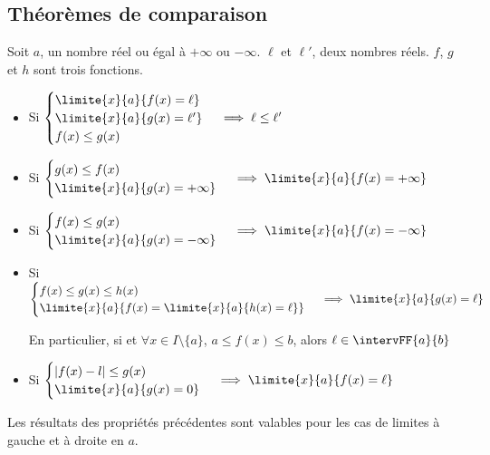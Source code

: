   \subsection{Théorèmes de comparaison}
\begin{propriete}[s]
	Soit $a$, un nombre réel ou égal à $+\infty$ ou $-\infty$. $\ell$ et $\ell'$, deux nombres réels. $f$, $g$ et $h$ sont trois fonctions.
	\begin{itemize}
		\item Si $\begin{cases}
		\limite{x}{a}{f(x)=\ell} \\
		\limite{x}{a}{g(x)=\ell'}\\
		f(x)\leq g(x)  
		\end{cases}\implies \ell \leq \ell'$
		\item Si $\begin{cases}
		g(x)\leq f(x)\\
		\limite{x}{a}{g(x)=+\infty}
		\end{cases}\implies \limite{x}{a}{f(x)=+\infty} $
		\item Si $\begin{cases}
		f(x)\leq g(x)\\
		\limite{x}{a}{g(x)=-\infty}
		\end{cases}\implies \limite{x}{a}{f(x)=-\infty} $
		\item Si $\begin{cases}
		f(x)\leq g(x)\leq h(x)\\
		\limite{x}{a}{f(x)=\limite{x}{a}{h(x)=\ell}}
		\end{cases}\implies \limite{x}{a}{g(x)=\ell} $
		\par En particulier, si  et $\forall x \in I\setminus\{a\}$, $a\leq f(x)\leq b$, alors $\ell\in \intervFF{a}{b}$
		\item Si $\begin{cases}
		\lvert f(x)-l\rvert \leq g(x)\\
		\limite{x}{a}{g(x)=0}
		\end{cases}\implies \limite{x}{a}{f(x)=\ell}$
	\end{itemize}
Les résultats des propriétés précédentes sont valables pour les cas de limites à gauche et à droite en $a$.
\end{propriete}
